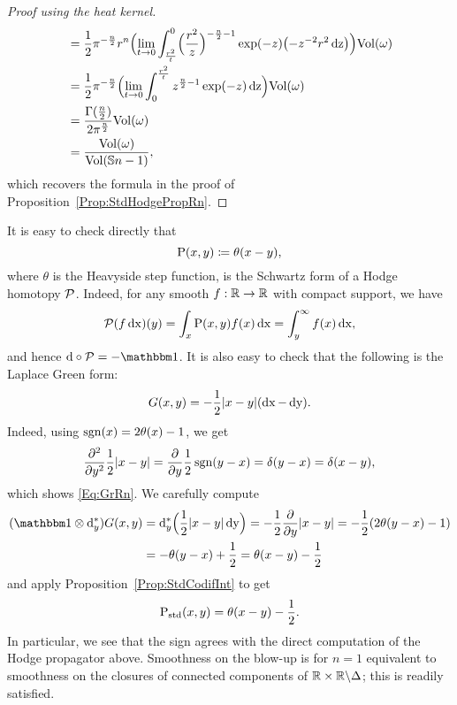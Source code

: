 \documentclass[\MainFolder/Text.tex]{subfiles}
\begin{document}
\begin{proof}[Proof using the heat kernel]
\begin{align*}
&=\frac{1}{2}\pi^{-\frac{n}{2}}r^n \Bigl(\lim_{t\to 0}\int_{\frac{r^2}{t}}^0 \Bigl(\frac{r^2}{z}\Bigr)^{-\frac{n}{2} - 1}\exp(-z)\bigl(-z^{-2}r^2\operatorname{dz}\bigr)\Bigr)\mathrm{Vol}(\omega)\\
&= \frac{1}{2}\pi^{-\frac{n}{2}}\Bigl(\lim_{t\to 0} \int_0^{\frac{r^2}{t}} z^{\frac{n}{2}-1} \exp(-z) \operatorname{dz}\Bigr)\mathrm{Vol}(\omega) \\
&= \frac{\Gamma(\frac{n}{2})}{2\pi^{\frac{n}{2}}}\mathrm{Vol}(\omega) \\
& = \frac{\mathrm{Vol}(\omega)}{\mathrm{Vol}(\mathbb{S}{n-1})},
\end{align*}
which recovers the formula in the proof of Proposition~\ref{Prop:StdHodgePropRn}.
\end{proof}

\begin{Example}[The case $n=1$]\label{Ex:SDFSDF}
It is easy to check directly that
$$ \mathrm{P}(x,y) \coloneqq \theta(x-y), $$
where $\theta$ is the Heavyside step function, is the Schwartz form of a Hodge homotopy $\mathcal{P}$. Indeed, for any smooth $f: \mathbb{R}\rightarrow\mathbb{R}$ with compact support, we have 
$$ \mathcal{P}(f \operatorname{dx})(y) = \int_x \mathrm{P}(x,y)f(x)\operatorname{dx} = \int_{y}^{\infty} f(x)\operatorname{dx}, $$
and hence $\Dd\circ\Htp = -\Id$. It is also easy to check that the following is the Laplace Green form:
$$ G(x,y) = - \frac{1}{2}|x-y|(\operatorname{dx}-\operatorname{dy}). $$
Indeed, using $\operatorname{sgn}(x) = 2\theta(x) - 1$, we get
$$ \frac{\partial^2}{\partial y^2} \frac{1}{2}|x-y| = \frac{\partial}{\partial y}\frac{1}{2}\operatorname{sgn}(y-x) = \delta(y-x) = \delta(x-y), $$
which shows \eqref{Eq:GrRn}. We carefully compute
\begin{align*}
(\Id\otimes \CoDd_y)\GKer(x,y) & = \CoDd_y \Bigl(\frac{1}{2}\Abs{x-y}\Diff{y}\Bigr) = -\frac{1}{2} \frac{\partial}{\partial y}\Abs{x-y} = -\frac{1}{2}(2\theta(y-x)-1) \\ &= - \theta(y-x) + \frac{1}{2} = \theta(x-y) - \frac{1}{2}
\end{align*}
and apply Proposition~\ref{Prop:StdCodifInt} to get
$$ \mathrm{P}_{\mathrm{std}}(x,y) = \theta(x-y) - \frac{1}{2}. $$
In particular, we see that the sign agrees with the direct computation of the Hodge propagator above. Smoothness on the blow-up is for $n=1$ equivalent to smoothness on the closures of connected components of $\mathbb{R}\times\mathbb{R}\backslash\Delta$; this is readily satisfied. 
\end{Example}
\end{document}
